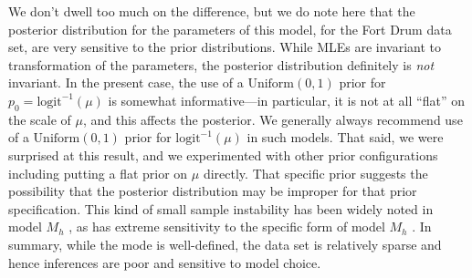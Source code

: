 We don't dwell too much on the difference, but we do note here that
the posterior distribution for the parameters of this model, for the
Fort Drum data set, are very sensitive to the prior
distributions. While MLEs are invariant to transformation of the
parameters, the posterior distribution definitely is {\it not}
invariant. In the present case, the use of a $\mbox{Uniform}(0,1)$
prior for $p_{0} = \mbox{logit}^{-1}(\mu)$ is somewhat
informative---in particular, it is not at all ``flat'' on the scale of
$\mu$, and this affects the posterior.  We generally always recommend
use of a $\mbox{Uniform}(0,1)$ prior for $\mbox{logit}^{-1}(\mu)$ in
such models. That said, we were surprised at this result, and we
experimented with other prior configurations including putting a flat
prior on $\mu$ directly. That specific prior suggests the possibility
that the posterior distribution may be improper for that prior
specification. This kind of small sample instability has been widely
noted in model $M_h$ \citep{fienberg_etal:1999, dorazio_royle:2003},
as has extreme sensitivity to the specific form of model $M_{h}$
\citep{link:2003}.  In summary, while the mode is well-defined, the
data set is relatively sparse and hence inferences are poor and
sensitive to model choice.






